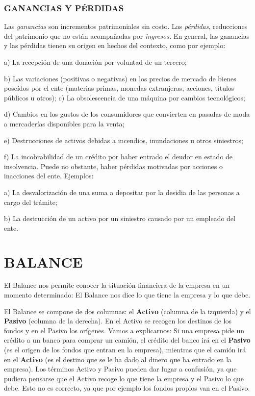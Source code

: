 \subsubsection*{GANANCIAS Y PÉRDIDAS}
Las \textit{ganancias }son incrementos patrimoniales sin costo. Las \textit{pérdidas}, reducciones del patrimonio que no están acompañadas por \textit{ingresos. }En general, las ganancias y las pérdidas tienen su origen en hechos del contexto, como por ejemplo:

a) La recepción de una donación por voluntad de un tercero;

b) Las variaciones (positivas o negativas) en los precios de mercado de bienes poseídos por el ente (materias primas, monedas extranjeras, acciones, títulos públicos u otros); c) La obsolescencia de una máquina por cambios tecnológicos;

d) Cambios en los gustos de los consumidores que convierten en pasadas de moda a mercaderías disponibles para la venta;

{\centering e) Destrucciones de activos debidas a incendios, inundaciones u otros siniestros;\par}



f) La incobrabilidad de un crédito por haber entrado el deudor en estado de insolvencia. Puede no obstante, haber pérdidas motivadas por acciones o inacciones del ente. Ejemplos:

a) La desvalorización de una suma a depositar por la desidia de las personas a cargo del trámite;

{\centering b) La destrucción de un activo por un siniestro causado por un empleado del ente.\par}

\section*{BALANCE}
El Balance nos permite conocer la situación financiera de la empresa en un momento determinado: El Balance nos dice lo que tiene la empresa y lo que debe.

El Balance se compone de dos columnas: el \textbf{Activo }(columna de la izquierda) y el \textbf{Pasivo} (columna de la derecha). En el Activo se recogen los destinos de los fondos y en el Pasivo los orígenes. Vamos a explicarnos: Si una empresa pide un crédito a un banco para comprar un camión, el crédito del banco irá en el \textbf{Pasivo }(es el origen de los fondos que entran en la empresa), mientras que el camión irá en el \textbf{Activo }(es el destino que se le ha dado al dinero que ha entrado en la empresa). Los términos Activo y Pasivo pueden dar lugar a confusión, ya que pudiera pensarse que el Activo recoge lo que tiene la empresa y el Pasivo lo que debe. Esto no es correcto, ya que por ejemplo los fondos propios van en el Pasivo.

